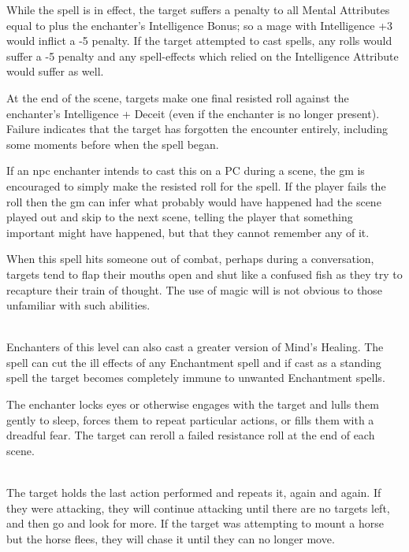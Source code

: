 \begin{multicols}{2}
While the spell is in effect, the target suffers a penalty to all Mental Attributes equal to  plus the enchanter's Intelligence Bonus; so a mage with Intelligence +3 would inflict a -5 penalty. If the target attempted to cast spells, any rolls would suffer a -5 penalty and any spell-effects which relied on the Intelligence Attribute would suffer as well.

At the end of the scene, targets make one final resisted roll against the enchanter's Intelligence + Deceit (even if the enchanter is no longer present). Failure indicates that the target has forgotten the encounter entirely, including some moments before when the spell began.

If an \gls{npc} enchanter intends to cast this on a PC during a scene, the \gls{gm} is encouraged to simply make the resisted roll for the spell. If the player fails the roll then the \gls{gm} can infer what probably would have happened had the scene played out and skip to the next scene, telling the player that something important might have happened, but that they cannot remember any of it.

When this spell hits someone out of combat, perhaps during a conversation, targets tend to flap their mouths open and shut like a confused fish as they try to recapture their train of thought. The use of magic will is not obvious to those unfamiliar with such abilities.

\\
Enchanters of this level can also cast a greater version of Mind's Healing. The spell can cut the ill effects of any Enchantment spell and if cast as a standing spell the target becomes completely immune to unwanted Enchantment spells.

\spelllevel

The enchanter locks eyes or otherwise engages with the target and lulls them gently to sleep, forces them to repeat particular actions, or fills them with a dreadful fear. The target can reroll a failed resistance roll at the end of each scene.

\\
The target holds the last action performed and repeats it, again and again.
If they were attacking, they will continue attacking until there are no targets left, and then go and look for more.
If the target was attempting to mount a horse but the horse flees, they will chase it until they can no longer move.


\end{multicols}
